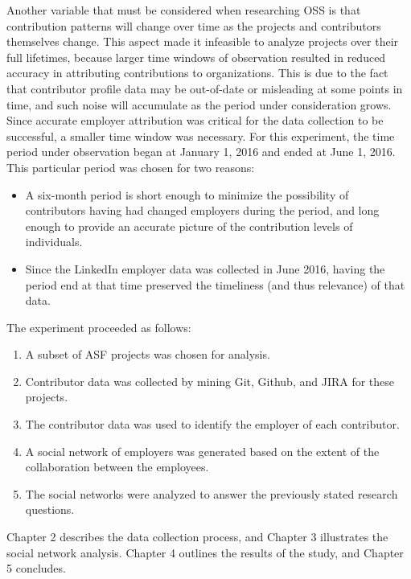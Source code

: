 Another variable that must be considered when researching OSS is that contribution patterns will change over time as the projects and contributors themselves change. This aspect made it infeasible to analyze projects over their full lifetimes, because larger time windows of observation resulted in reduced accuracy in attributing contributions to organizations. This is due to the fact that contributor profile data may be out-of-date or misleading at some points in time, and such noise will accumulate as the period under consideration grows. Since accurate employer attribution was critical for the data collection to be successful, a smaller time window was necessary. For this experiment, the time period \timeperiod{} under observation began at January 1, 2016 and ended at June 1, 2016. This particular period was chosen for two reasons:
\begin{itemize}
	\item A six-month period is short enough to minimize the possibility of contributors having had changed employers during the period, and long enough to provide an accurate picture of the contribution levels of individuals.
	\item Since the LinkedIn employer data was collected in June 2016, having the period end at that time preserved the timeliness (and thus relevance) of that data.
\end{itemize}

The experiment proceeded as follows:
\begin{enumerate}
	\item A subset of ASF projects was chosen for analysis.
	\item Contributor data was collected by mining Git, Github, and JIRA for these projects.
	\item The contributor data was used to identify the employer of each contributor.
	\item A social network of employers was generated based on the extent of the collaboration between the employees.
	\item The social networks were analyzed to answer the previously stated research questions.
\end{enumerate}
Chapter 2 describes the data collection process, and Chapter 3 illustrates the social network analysis. Chapter 4 outlines the results of the study, and Chapter 5 concludes.